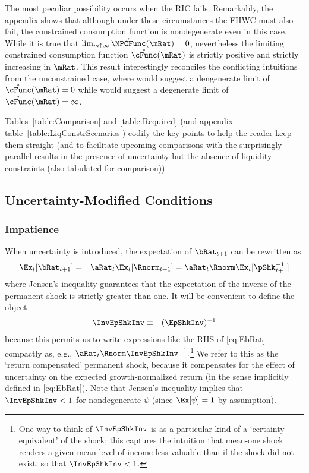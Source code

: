 \documentclass[titlepage]{\econtex}\providecommand{\texname}{BufferStockTheory}%
\begin{document}
The most peculiar possibility occurs when the RIC fails.  Remarkably,
the appendix shows that although under these circumstances the FHWC
must also fail, the constrained consumption function is nondegenerate even in
this case.  While it is true that $\lim_{m \uparrow \infty}
\mathring{\MPCFunc}(\mRat) = 0$, nevertheless the limiting constrained
consumption function $\mathring{\cFunc}(\mRat)$ is strictly positive
and strictly increasing in $\mRat$.  This result interestingly
reconciles the conflicting intuitions from the unconstrained case,
where  would suggest a dengenerate limit of
$\mathring{\cFunc}(\mRat)=0$ while  would suggest a
degenerate limit of $\mathring{\cFunc}(\mRat)=\infty$.

Tables~\ref{table:Comparison} and \ref{table:Required} (and appendix
table~\ref{table:LiqConstrScenarios}) codify the key points to help
the reader keep them straight (and to facilitate upcoming comparisons
with the surprisingly parallel results in the presence of uncertainty
but the absence of liquidity constraints (also tabulated for comparison)).

\subsection{Uncertainty-Modified Conditions}
\subsubsection{Impatience}

When uncertainty is introduced, the expectation of $\bRat_{t+1}$ can be rewritten as:
\begin{eqnarray}
  \Ex_{t}[\bRat_{t+1}] & = &  \aRat_{t}\Ex_{t}[\Rnorm_{t+1}] = \aRat_{t}\Rnorm\Ex_{t}[\pShk_{t+1}^{-1}] \label{eq:EbRat}
\end{eqnarray}
where Jensen's inequality guarantees that the expectation of the inverse of the permanent
shock is strictly greater than one.  It will be convenient to define the object
\begin{eqnarray*}
  \InvEpShkInv & \equiv & (\EpShkInv)^{-1}
\end{eqnarray*}
because this permits us to write expressions like the RHS of
\eqref{eq:EbRat} compactly as, e.g., $\aRat_{t}\Rnorm
\InvEpShkInv^{-1}.$\footnote{One way to think of $\InvEpShkInv$ is as
  a particular kind of a `certainty equivalent' of the shock; this
  captures the intuition that mean-one shock renders a given mean
  level of income less valuable than if the shock did not exist, so
  that $\InvEpShkInv < 1$.}  We refer to this as the `return
compensated' permanent shock, because it compensates for the effect of
uncertainty on the expected growth-normalized return (in the sense implicitly defined in
\eqref{eq:EbRat}).  Note that Jensen's inequality implies that $\InvEpShkInv < 1$ for nondegenerate $\psi$ (since
$\Ex[\psi]=1$ by assumption).
\end{document}
